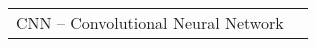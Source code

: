 
\begin{thenotations}
\renewcommand{\arraystretch}{1.5}
  \noindent
  \begin{tabular}{ll}

CNN -- Convolutional Neural Network\\

  \end{tabular}

\end{thenotations}